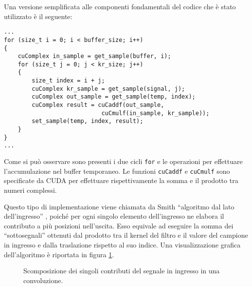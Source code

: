 Una versione semplificata alle componenti fondamentali del codice che è stato utilizzato è il seguente:
\begin{lstlisting}
...
for (size_t i = 0; i < buffer_size; i++)
{
    cuComplex in_sample = get_sample(buffer, i);
    for (size_t j = 0; j < kr_size; j++)
    {
        size_t index = i + j;
        cuComplex kr_sample = get_sample(signal, j);
        cuComplex out_sample = get_sample(temp, index);
        cuComplex result = cuCaddf(out_sample,
                            cuCmulf(in_sample, kr_sample));
        set_sample(temp, index, result);
    }
}
...
\end{lstlisting}
Come si può osservare sono presenti i due cicli \lstinline{for} e le operazioni per effettuare l'accumulazione nel buffer temporaneo. Le funzioni \lstinline{cuCaddf} e \lstinline{cuCmulf} sono specificate da CUDA per effettuare rispettivamente la somma e il prodotto tra numeri complessi.

Questo tipo di implementazione viene chiamata da Smith ``algoritmo dal lato dell'ingresso'' \cite[pp.~112-115]{dspguide}, poiché per ogni singolo elemento dell'ingresso ne elabora il contributo a più posizioni nell'uscita. Esso equivale ad eseguire la somma dei ``sottosegnali'' ottenuti dal prodotto tra il kernel del filtro e il valore del campione in ingresso e dalla traslazione rispetto al suo indice. Una visualizzazione grafica dell'algoritmo è riportata in figura \ref{fig:convingresso}.

\begin{figure}[h!]
    \centering
    
    
    \caption{Scomposizione dei singoli contributi del segnale in ingresso in una convoluzione.}
    \label{fig:convingresso}
\end{figure}


